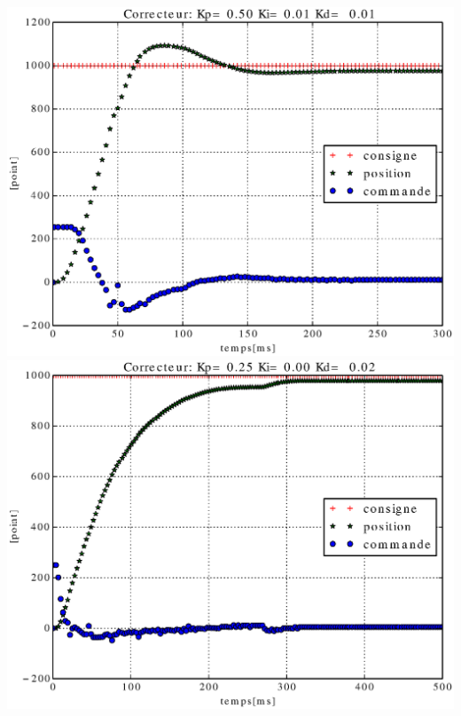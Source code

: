 \documentclass[12pt,a4paper]{article}
\begin{document}
\includegraphics[scale=0.4]{images/figure_essai_9.eps}
\includegraphics[scale=0.4]{images/figure_essai_10.eps}
\end{document}
